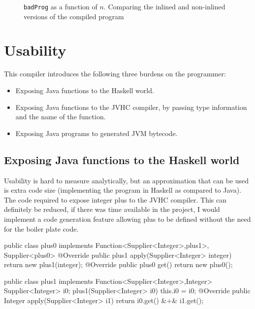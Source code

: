 \documentclass[float=false, crop=false]{standalone}
\newlength\gwidth
\newlength\gheight
\newcommand{\importMGraph}[3]{\setlength{\gwidth}{#2}\setlength{\gheight}{#3}{#1}}
\begin{document}
\begin{figure}
  \centering
  \importMGraph{plotBadInline}{0.96\textwidth}{0.3\textwidth}
  \caption[\texttt{badProg} as a function of $n$]{\texttt{badProg} as a function of $n$. Comparing the inlined and non-inlined
  versions of the compiled program}
    \label{plot:badInline}
\end{figure}

\section{Usability}

This compiler introduces the following three burdens on the programmer:

\begin{itemize}
  \item Exposing Java functions to the Haskell world.

  \item Exposing Java functions to the JVHC compiler, by passing type information and the name 
    of the function.

  \item Exposing Java programs to generated JVM bytecode.
\end{itemize}

\subsection{Exposing Java functions to the Haskell world}

Usability is hard to measure analytically, but an approximation that can be used is extra code size
(implementing the program in Haskell as compared to Java).
The code required to expose integer plus to the JVHC compiler. 
This can definitely be reduced, if there was time available in the project,
I would implement a code generation feature allowing plus to be defined
without the need for the boiler plate code.

\begin{JavaLst}
public class plus0 implements Function<Supplier<Integer>,plus1>, 
                              Supplier<plus0> {
    @Override
    public plus1 apply(Supplier<Integer> integer) 
      { return new plus1(integer); }
    @Override
    public plus0 get() { return new plus0(); }
}

public class plus1 implements Function<Supplier<Integer>,Integer>{
    Supplier<Integer> i0;
    plus1(Supplier<Integer> i0) { this.i0 = i0; }
    @Override
    public Integer apply(Supplier<Integer> i1) 
      { return i0.get() &\textcolor{pgreen}{+}& i1.get(); }
}
\end{JavaLst}
\end{document}
